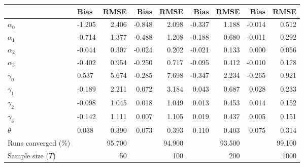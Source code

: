 
\begin{tabular}[t]{llrrrrrrr}
\toprule
  & Bias & RMSE & Bias & RMSE & Bias & RMSE & Bias & RMSE\\
\midrule
$\alpha_{0}$ & -1.205 & 2.406 & -0.848 & 2.098 & -0.337 & 1.188 & -0.014 & 0.512\\
$\alpha_{1}$ & -0.714 & 1.377 & -0.488 & 1.208 & -0.188 & 0.680 & -0.011 & 0.292\\
$\alpha_{2}$ & -0.044 & 0.307 & -0.024 & 0.202 & -0.021 & 0.133 & 0.000 & 0.056\\
$\alpha_{3}$ & -0.402 & 0.954 & -0.250 & 0.717 & -0.095 & 0.412 & -0.010 & 0.178\\
$\gamma_{0}$ & 0.537 & 5.674 & -0.285 & 7.698 & -0.347 & 2.234 & -0.265 & 0.921\\
$\gamma_{1}$ & -0.189 & 2.211 & 0.072 & 3.184 & 0.043 & 0.687 & 0.028 & 0.233\\
$\gamma_{2}$ & -0.098 & 1.045 & 0.018 & 1.049 & 0.013 & 0.453 & 0.014 & 0.152\\
$\gamma_{3}$ & -0.142 & 1.111 & 0.007 & 1.105 & 0.019 & 0.437 & 0.005 & 0.151\\
$\theta$ & 0.038 & 0.390 & 0.073 & 0.393 & 0.110 & 0.403 & 0.075 & 0.314\\
Runs converged (\%) &  & 95.700 &  & 94.900 &  & 93.500 &  & 99.100\\
Sample size ($T$) &  & 50 &  & 100 &  & 200 &  & 1000\\
\bottomrule
\end{tabular}
